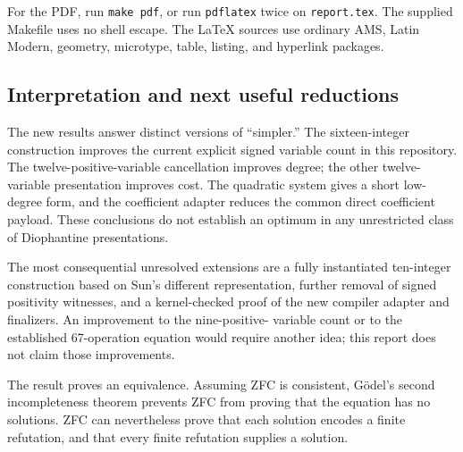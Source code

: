 For the PDF, run \texttt{make pdf}, or run \texttt{pdflatex} twice on
\texttt{report.tex}. The supplied Makefile uses no shell escape.
The LaTeX sources use ordinary AMS, Latin Modern, geometry, microtype,
table, listing, and hyperlink packages.

\subsection{Interpretation and next useful reductions}

The new results answer distinct versions of ``simpler.'' The sixteen-integer
construction improves the current explicit signed variable count in this
repository. The twelve-positive-variable cancellation improves degree;
the other twelve-variable presentation improves cost. The quadratic
system gives a short low-degree form, and the coefficient adapter reduces
the common direct coefficient payload. These conclusions do not establish
an optimum in any unrestricted class of Diophantine presentations.

The most consequential unresolved extensions are a fully instantiated
ten-integer construction based on Sun's different representation, further
removal of signed positivity witnesses, and a kernel-checked proof of the
new compiler adapter and finalizers. An improvement to the nine-positive-
variable count or to the established 67-operation equation would require
another idea; this report does not claim those improvements.

The result proves an equivalence. Assuming ZFC is consistent, G\"odel's
second incompleteness theorem prevents ZFC from proving that the equation
has no solutions. ZFC can nevertheless prove that each solution encodes
a finite refutation, and that every finite refutation supplies a solution.
